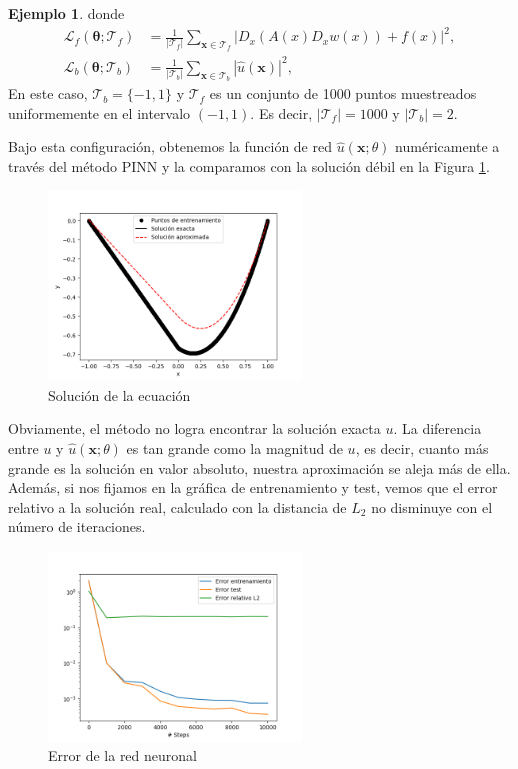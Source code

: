 \documentclass[a4paper,11pt,spanish, twoside, leqno]{tfg-uam}
\theoremstyle{definition}
\newtheorem{exmp}[teor]{Ejemplo}
\begin{document}
\begin{mdframed}
\begin{exmp}
        donde
        \begin{align*}
            \mathcal{L}_f(\boldsymbol{\theta}; \mathcal{T}_f) &= \frac{1}{|\mathcal{T}_f|} \sum_{\mathbf{x} \in \mathcal{T}_f} |D_{x}(A(x)D_{x} w(x))+f(x)|^2, \\ 
            \mathcal{L}_b(\boldsymbol{\theta}; \mathcal{T}_b) &= \frac{1}{|\mathcal{T}_b|} \sum_{\mathbf{x} \in \mathcal{T}_b} |\hat{u} (\mathbf{x})|^2,
        \end{align*}
        En este caso, $\mathcal{T}_b=\{-1,1\}$ y $\mathcal{T}_f$ es un conjunto de 1000 puntos muestreados uniformemente en el intervalo $(-1,1)$. Es decir, $|\mathcal{T}_f|=1000$ y $|\mathcal{T}_b|=2$.

        Bajo esta configuración, obtenemos la función de red $\hat{u}(\mathbf{x};\theta)$ numéricamente a través del método PINN y la comparamos con la solución débil en la Figura \ref{fig:deviation}. 

        \begin{figure}[H] 
            \centering
            \includegraphics[width=0.6\textwidth]{Figuras/fallo_edp_pinn.png}
            \caption{Solución de la ecuación}
            \label{fig:deviation}
        \end{figure}

        Obviamente, el método no logra encontrar la solución exacta $u$. La diferencia entre $u$ y $\hat{u}(\mathbf{x};\theta)$ es tan grande como la magnitud de $u$, es decir, cuanto más grande es la solución en valor absoluto, nuestra aproximación se aleja más de ella. Además, si nos fijamos en la gráfica de entrenamiento y test, vemos que el error relativo a la solución real, calculado con la distancia de $L_2$ no disminuye con el número de iteraciones.
        \begin{figure}[H]
            \centering
            \includegraphics[width=0.6\textwidth]{Figuras/test_train_pinn_error.png}
            \caption{Error de la red neuronal}
        \end{figure}


\end{exmp}
\end{mdframed}
\end{document}
